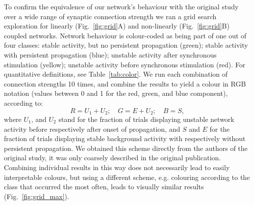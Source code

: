 \documentclass[10pt,a4paper,onecolumn]{article}
\begin{document}
To confirm the equivalence of our network's behaviour with the original study over a wide range of synaptic connection strength we ran a grid search exploration for linearly (Fig.~\ref{fig:grid}A) and non-linearly (Fig.~\ref{fig:grid}B) coupled networks. Network behaviour is colour-coded as being part of one out of four classes: stable activity, but no persistent propagation (green); stable activity with persistent propagation (blue); unstable activity after synchronous stimulation (yellow); unstable activity before synchronous stimulation (red). For quantitative definitions, see Table~\ref{tab:color}. We run each combination of connection strengths 10 times, and combine the results to yield a colour in RGB notation (values between 0 and 1 for the red, green, and blue component), according to:
\begin{equation}
R = U_1 + U_2;\quad G = E + U_2;\quad B = S,
\end{equation}
where $U_1$, and $U_2$ stand for the fraction of trials displaying unstable network activity before respectively after onset of propagation, and $S$ and $E$ for the fraction of trials displaying stable background activity with respectively without persistent propagation. We obtained this scheme directly from the authors of the original study, it was only coarsely described in the original publication. Combining individual results in this way does not necessarily lead to easily interpretable colours, but using a different scheme, e.g. colouring according to the class that occurred the most often, leads to visually similar results (Fig.~\ref{fig:grid_max}).
\end{document}
